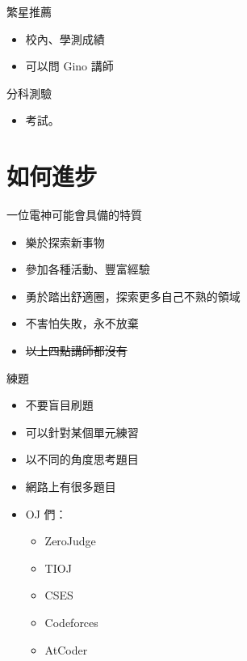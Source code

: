 \documentclass[aspectratio=169]{beamer}
\begin{document}
	\begin{frame}{繁星推薦}
		\begin{itemize}
			\item 校內、學測成績
			\item 可以問 Gino 講師
		\end{itemize}
	\end{frame}

	\begin{frame}{分科測驗}
		\begin{itemize}
			\item 考試。
		\end{itemize}
	\end{frame}

	\section{如何進步}

	\begin{frame}{一位電神可能會具備的特質}
		\begin{itemize}
			\item<1-> 樂於探索新事物
			\item<2-> 參加各種活動、豐富經驗
			\item<3-> 勇於踏出舒適圈，探索更多自己不熟的領域
			\item<4-> 不害怕失敗，永不放棄
			\item<5-> \sout{以上四點講師都沒有}
		\end{itemize}
	\end{frame}

	\begin{frame}{練題}
		\begin{itemize}
			\item<1-> 不要盲目刷題 
			\item<2-> 可以針對某個單元練習
			\item<2-> 以不同的角度思考題目
			\item<3-> 網路上有很多題目
			\item<3-> OJ 們：
			\begin{itemize}
				\item ZeroJudge
				\item TIOJ
				\item CSES
				\item Codeforces
				\item AtCoder
			\end{itemize}
		\end{itemize}
	\end{frame}
\end{document}
